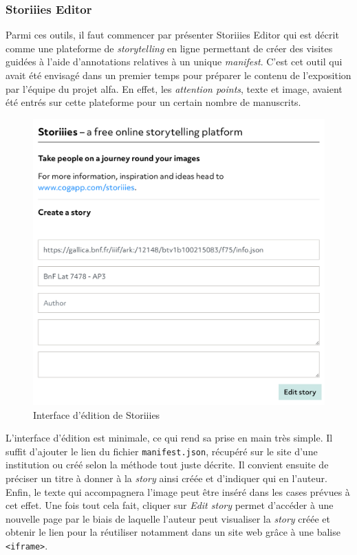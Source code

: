 	\subsubsection{Storiiies Editor}
	Parmi ces outils, il faut commencer par présenter Storiiies Editor qui est décrit comme une plateforme de \textit{storytelling} en ligne permettant de créer des visites guidées à l'aide d'annotations relatives à un unique \textit{manifest}. C'est cet outil qui avait été envisagé dans un premier temps pour préparer le contenu de l'exposition par l'équipe du projet \acrshort{alfa}. En effet, les \textit{attention points}, texte et image, avaient été entrés sur cette plateforme pour un certain nombre de manuscrits. 
	
	\begin{figure}[h]
	\caption{Interface d'édition de Storiiies}
	\includegraphics[scale=0.4, angle=0]{images/partie3/storiiies/storiiies-editor.png}
    \centering
    \end{figure}
	
	L'interface d'édition est minimale, ce qui rend sa prise en main très simple. Il suffit d'ajouter le lien du fichier \texttt{manifest.json}, récupéré sur le site d'une institution ou créé selon la méthode tout juste décrite. Il convient ensuite de préciser un titre à donner à la \textit{story} ainsi créée et d'indiquer qui en l'auteur. Enfin, le texte qui accompagnera l'image peut être inséré dans les cases prévues à cet effet. Une fois tout cela fait, cliquer sur \textit{Edit story} permet d'accéder à une nouvelle page par le biais de laquelle l'auteur peut visualiser la \textit{story} créée et obtenir le lien pour la réutiliser notamment dans un site web grâce à une balise \texttt{<iframe>}. 
	
